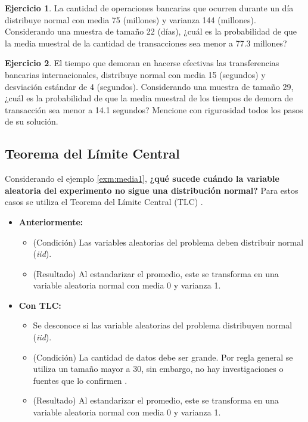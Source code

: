 \documentclass[
  11pt,
]{book}
\providecommand{\tightlist}{%
  \setlength{\itemsep}{0pt}\setlength{\parskip}{0pt}}
\theoremstyle{definition}
\theoremstyle{definition}
\theoremstyle{definition}
\newtheorem{exercise}{Ejercicio}[chapter]
\theoremstyle{definition}
\theoremstyle{remark}
\begin{document}
\begin{exercise}
La cantidad de operaciones bancarias que ocurren durante un día distribuye normal con media 75 (millones) y varianza 144 (millones). Considerando una muestra de tamaño 22 (días), ¿cuál es la probabilidad de que la media muestral de la cantidad de transacciones sea menor a 77.3 millones?
\end{exercise}

\begin{exercise}
El tiempo que demoran en hacerse efectivas las transferencias bancarias internacionales, distribuye normal con media 15 (segundos) y desviación estándar de 4 (segundos). Considerando una muestra de tamaño 29, ¿cuál es la probabilidad de que la media muestral de los tiempos de demora de transacción sea menor a 14.1 segundos? Mencione con rigurosidad todos los pasos de su solución.
\end{exercise}

\subsection{Teorema del Límite Central}\label{distribucionesmuestrales-media-tlc}

Considerando el ejemplo \ref{exm:media1}, \textbf{¿qué sucede cuándo la variable aleatoria del experimento no sigue una distribución normal?} Para estos casos se utiliza el Teorema del Límite Central (TLC) \citep[página 215]{Devore}.

\begin{itemize}
\tightlist
\item
  \textbf{Anteriormente:}

  \begin{itemize}
  \tightlist
  \item
    (Condición) Las variables aleatorias del problema deben distribuir normal (\emph{iid}).
  \item
    (Resultado) Al estandarizar el promedio, este se transforma en una variable aleatoria normal con media 0 y varianza 1.
  \end{itemize}
\item
  \textbf{Con TLC:}

  \begin{itemize}
  \tightlist
  \item
    Se desconoce si las variable aleatorias del problema distribuyen normal (\emph{iid}).
  \item
    (Condición) La cantidad de datos debe ser grande. Por regla general se utiliza un tamaño mayor a 30, sin embargo, no hay investigaciones o fuentes que lo confirmen \citep{johnson1994sample}.
  \item
    (Resultado) Al estandarizar el promedio, este se transforma en una variable aleatoria normal con media 0 y varianza 1.
  \end{itemize}
\end{itemize}
\end{document}
